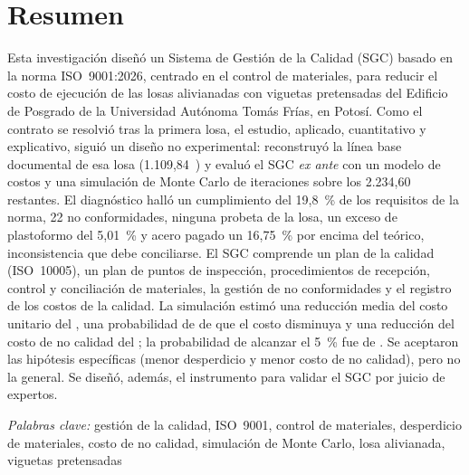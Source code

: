 \chapter*{Resumen}
\noindent Esta investigación diseñó un Sistema de Gestión de la Calidad (SGC) basado en la norma ISO~9001:2026, centrado en el control de materiales, para reducir el costo de ejecución de las losas alivianadas con viguetas pretensadas del Edificio de Posgrado de la Universidad Autónoma Tomás Frías, en Potosí. Como el contrato se resolvió tras la primera losa, el estudio, aplicado, cuantitativo y explicativo, siguió un diseño no experimental: reconstruyó la línea base documental de esa losa (1.109,84~\mdos{}) y evaluó el SGC \emph{ex ante} con un modelo de costos y una simulación de Monte Carlo de \MCiter{} iteraciones sobre los 2.234,60~\mdos{} restantes. El diagnóstico halló un cumplimiento del 19,8~\% de los requisitos de la norma, 22 no conformidades, ninguna probeta de la losa, un exceso de plastoformo del 5,01~\% y acero pagado un 16,75~\% por encima del teórico, inconsistencia que debe conciliarse. El SGC comprende un plan de la calidad (ISO~10005), un plan de puntos de inspección, procedimientos de recepción, control y conciliación de materiales, la gestión de no conformidades y el registro de los costos de la calidad. La simulación estimó una reducción media del costo unitario del \rMedia{}, una probabilidad de \PRpos{} de que el costo disminuya y una reducción del costo de no calidad del \CNCreduccionPct{}; la probabilidad de alcanzar el 5~\% fue de \PHG{}. Se aceptaron las hipótesis específicas (menor desperdicio y menor costo de no calidad), pero no la general. Se diseñó, además, el instrumento para validar el SGC por juicio de expertos.

\emph{Palabras clave:} gestión de la calidad, ISO~9001, control de materiales, desperdicio de materiales, costo de no calidad, simulación de Monte Carlo, losa alivianada, viguetas pretensadas

